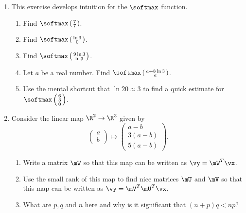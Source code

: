 \documentclass{article}
\newcommand{\twovector}[2]{ \begin{smallmatrix} #1 \\ #2 \end{smallmatrix} }
\newcommand{\ptwovector}[2]{ \left( \twovector{#1}{#2} \right) }
\begin{document}
\begin{enumerate}
\item \label{DFN_ex_softmax} 
This exercise develops intuition for the $\softmax$ function.
\begin{enumerate}
    \item Find $\softmax \ptwovector{7}{7}$.
    \item Find $\softmax \ptwovector{\ln 3}{0}$.
    \item Find $\softmax \ptwovector{9\ln 3}{\ln 3}$.
    \item Let $a$ be a real number. Find $\softmax \ptwovector{a + 8 \ln 3}{a}$.
    \item Use the mental shortcut that $\ln 20 \approx 3$ to find a quick estimate for $\softmax \left(\begin{smallmatrix} 6 \\ 3 \\ 0 \end{smallmatrix}\right)$.
\end{enumerate}

\item \label{DFN_ex_linearhiddenunit} 
Consider the linear map $\R^2 \to \R^3$ given by
\begin{equation*}
\begin{pmatrix} a \\ b \end{pmatrix} 
\mapsto      
\begin{pmatrix} a - b \\ 3(a - b) \\ 5(a - b) \end{pmatrix}.
\end{equation*}
\begin{enumerate}
    \item Write a matrix $\mW$ so that this map can be written as $\vy = \mW^T \vx$.
    \item Use the small rank of this map to find nice matrices $\mU$ and $\mV$ so that this map can be written as $\vy = \mV^T \mU^T \vx$.
    \item What are $p, q$ and $n$ here and why is it significant that $(n+p)q < np$?
\end{enumerate}


\end{enumerate}
\end{document}
